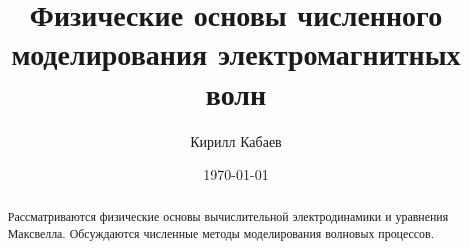 \documentclass[12pt,a4paper]{article}
\title{
    Физические основы численного
    моделирования электромагнитных волн
}
\author{Кирилл Кабаев}
\date{\today}
\begin{document}
\maketitle

\begin{abstract}
Рассматриваются физические основы
вычислительной электродинамики
и уравнения Максвелла.
Обсуждаются численные методы моделирования
волновых процессов.
\end{abstract}











\printbibliography[title={Список литературы}]
\end{document}
